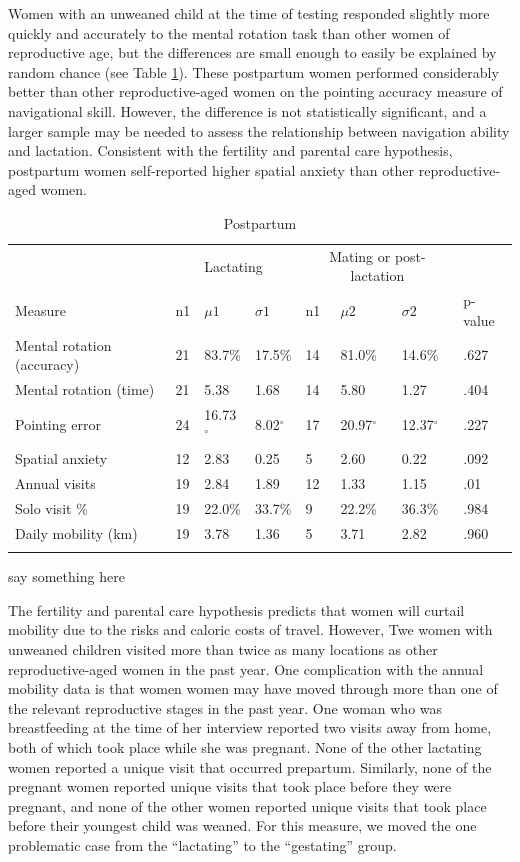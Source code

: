 Women with an unweaned child at the time of testing responded slightly more quickly and accurately to the mental rotation task than other women of reproductive age, but the differences are small enough to easily be explained by random chance (see Table \ref{tab:lact}).  These postpartum women performed considerably better than other reproductive-aged women on the pointing accuracy measure of navigational skill.  However, the difference is not statistically significant, and a larger sample may be needed to assess the relationship between navigation ability and lactation.  Consistent with the fertility and parental care hypothesis, postpartum women self-reported higher spatial anxiety than other reproductive-aged women.

\begin{table}[h!]
\caption{Postpartum}
\label{tab:lact}  
\begin{tabular}{llllllll}
\hline\noalign{\smallskip}
& \multicolumn{3}{c}{Lactating} & \multicolumn{3}{c}{Mating or post-lactation} & \\
Measure & n1 & $\mu1$ & $\sigma1$ & n1 & $\mu2$ & $\sigma2$ & p-value \\
\noalign{\smallskip}\hline\noalign{\smallskip}
Mental rotation (accuracy) & 21 & 83.7\% & 17.5\% & 14 & 81.0\% & 14.6\% & .627 \\
Mental rotation (time) & 21 & 5.38 & 1.68 & 14 & 5.80 & 1.27 & .404 \\
Pointing error & 24 & 16.73$^{\circ}$ & 8.02$^{\circ}$ & 17 & 20.97$^{\circ}$ & 12.37$^{\circ}$ & .227 \\
Spatial anxiety & 12 & 2.83 & 0.25 & 5 & 2.60 & 0.22 & .092 \\
Annual visits & 19 & 2.84 & 1.89 & 12 & 1.33 & 1.15 & .01 \\
Solo visit \% & 19 & 22.0\% & 33.7\% & 9 & 22.2\% & 36.3\% & .984 \\
Daily mobility (km) & 19 & 3.78 & 1.36 & 5 & 3.71 & 2.82 & .960 \\
\noalign{\smallskip}\hline
\end{tabular}\par
\bigskip
say something here
\end{table}	

The fertility and parental care hypothesis predicts that women will curtail mobility due to the risks and caloric costs of travel.  However, Twe women with unweaned children visited more than twice as many locations as other reproductive-aged women in the past year.  One complication with the annual mobility data is that women women may have moved through more than one of the relevant reproductive stages in the past year.  One woman who was breastfeeding at the time of her interview reported two visits away from home, both of which took place while she was pregnant.  None of the other lactating women reported a unique visit that occurred prepartum.  Similarly, none of the pregnant women reported unique visits that took place before they were pregnant, and none of the other women reported unique visits that took place before their youngest child was weaned.  For this measure, we moved the one problematic case from the ``lactating'' to the ``gestating'' group.


